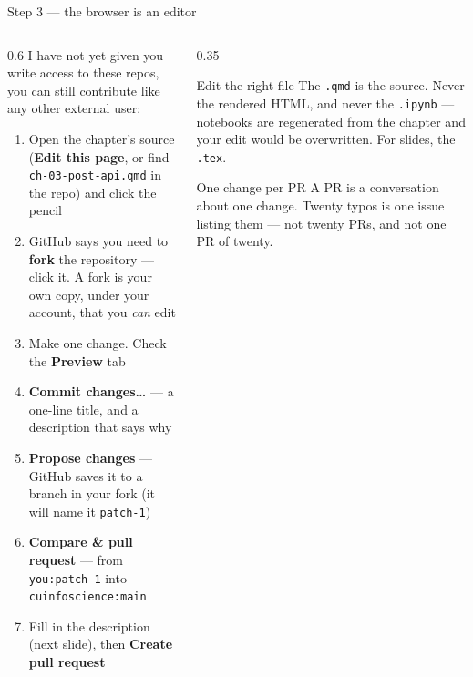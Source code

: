 \documentclass[9pt,aspectratio=169]{beamer}
\begin{document}
\begin{frame}{Step 3 --- the browser is an editor}
    \begin{columns}[T]
        \begin{column}{0.6\textwidth}
            I have not yet given you write access to these repos, you can still contribute like any other external user:
            \begin{enumerate}\small
                \item Open the chapter's source (\textbf{Edit this page}, or find \texttt{ch-03-post-api.qmd} in the repo) and click the pencil
                \item GitHub says you need to \textbf{fork} the repository --- click it. A fork is your own copy, under your account, that you \textit{can} edit
                \item Make one change. Check the \textbf{Preview} tab
                \item \textbf{Commit changes\ldots} --- a one-line title, and a description that says why
                \item \textbf{Propose changes} --- GitHub saves it to a branch in your fork (it will name it \texttt{patch-1})
                \item \textbf{Compare \& pull request} --- from \texttt{you:patch-1} into \texttt{cuinfoscience:main}
                \item Fill in the description (next slide), then \textbf{Create pull request}
            \end{enumerate}
        \end{column}
        \begin{column}{0.35\textwidth}
            \begin{alertblock}{Edit the right file}
                \small The \texttt{.qmd} is the source. Never the rendered HTML, and never the \texttt{.ipynb} --- notebooks are regenerated from the chapter and your edit would be overwritten. For slides, the \texttt{.tex}.
            \end{alertblock}
            \begin{alertblock}{One change per PR}
                \small A PR is a conversation about one change. Twenty typos is one issue listing them --- not twenty PRs, and not one PR of twenty.
            \end{alertblock}
        \end{column}
    \end{columns}
\end{frame}
\end{document}
